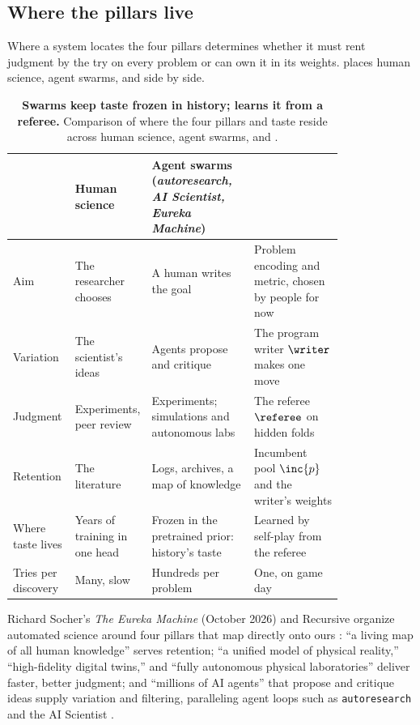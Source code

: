 \subsection{Where the pillars live}\label{sub:anatomy-where}

Where a system locates the four pillars determines whether it must rent judgment by the try on every problem or can own it in its weights.  places human science, agent swarms, and \EZ{} side by side.

\begin{table}[t]
  \caption{\textbf{Swarms keep taste frozen in history; \EZ{} learns it from a referee.} Comparison of where the four pillars and taste reside across human science, agent swarms, and \EZ{}.}
  \label{tab:pillars-live}
  \centering
  \small
  \begin{tabular}{@{}l p{0.23\linewidth} p{0.31\linewidth} p{0.27\linewidth}@{}}
    \toprule
    & Human science & Agent swarms (\emph{autoresearch, AI Scientist, Eureka Machine}) & \EZ{} \\
    \midrule
    Aim & The researcher chooses & A human writes the goal & Problem encoding and metric, chosen by people for now \\
    Variation & The scientist's ideas & Agents propose and critique & The program writer $\writer$ makes one move \\
    Judgment & Experiments, peer review & Experiments; simulations and autonomous labs & The referee $\referee$ on hidden folds \\
    Retention & The literature & Logs, archives, a map of knowledge & Incumbent pool $\inc{p}$ and the writer's weights \\
    Where taste lives & Years of training in one head & Frozen in the pretrained prior: history's taste & Learned by self-play from the referee \\
    Tries per discovery & Many, slow & Hundreds per problem & One, on game day \\
    \bottomrule
  \end{tabular}
\end{table}

Richard Socher's \emph{The Eureka Machine} (October 2026) and Recursive organize automated science around four pillars that map directly onto ours \citep{socher2026eureka,recursive2026research}: ``a living map of all human knowledge'' serves retention; ``a unified model of physical reality,'' ``high-fidelity digital twins,'' and ``fully autonomous physical laboratories'' deliver faster, better judgment; and ``millions of AI agents'' that propose and critique ideas supply variation and filtering, paralleling agent loops such as \texttt{autoresearch} \citep{karpathy2026autoresearch} and the AI Scientist \citep{lu2024aiscientist,gottweis2025coscientist}.


